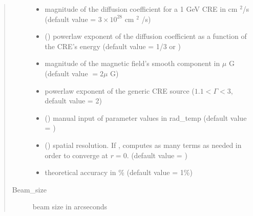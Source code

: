 \documentclass[letterpaper,10pt,english]{sphinxmanual}
\begin{document}
\begin{fulllineitems}
\begin{quote}
\begin{description}
\begin{itemize}
\item {} 
\sphinxAtStartPar
{} \textendash{} magnitude of the diffusion coefficient for a 1 GeV CRE in cm \({}^2\)/s (default value = \(3\times 10^{28}\) cm \({}^2\) /s)

\item {} 
\sphinxAtStartPar
{} (\sphinxstyleliteralemphasis{\sphinxupquote{, }}) \textendash{} power\sphinxhyphen{}law exponent of the diffusion coefficient as a function of the CRE’s energy (default value = 1/3 or )

\item {} 
\sphinxAtStartPar
{} \textendash{} magnitude of the magnetic field’s smooth component in \(\mu\) G (default value \(= 2 \mu\) G)

\item {} 
\sphinxAtStartPar
{} \textendash{} power\sphinxhyphen{}law exponent of the generic CRE source (\(1.1 < \Gamma < 3\), default value = 2)

\item {} 
\sphinxAtStartPar
{} () \textendash{} manual input of parameter values in rad\_temp (default value = )

\item {} 
\sphinxAtStartPar
{} () \textendash{} spatial resolution. If ,  computes as many terms as needed in order to converge at \(r=0\). (default value = )

\item {} 
\sphinxAtStartPar
{} \textendash{} theoretical accuracy in \% (default value = 1\%)

\end{itemize}

\item[{Beam\_size}] \leavevmode
\sphinxAtStartPar
beam size in arcseconds


\end{description}
\end{quote}
\end{fulllineitems}
\end{document}

